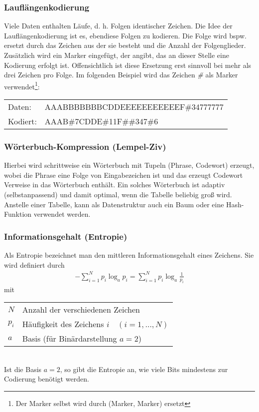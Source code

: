 \documentclass[11pt]{article}
\begin{document}
\subsubsection{Lauflängenkodierung}
Viele Daten enthalten Läufe, d. h. Folgen identischer Zeichen. Die Idee der Lauflängenkodierung ist es, ebendiese Folgen zu kodieren. Die Folge wird bspw. ersetzt durch das Zeichen aus der sie besteht und die Anzahl der Folgenglieder. Zusätzlich wird ein Marker eingefügt, der angibt, das an dieser Stelle eine Kodierung erfolgt ist. Offensichtlich ist diese Ersetzung erst sinnvoll bei mehr als drei Zeichen pro Folge. Im folgenden Beispiel wird das Zeichen \emph{\#} als Marker verwendet\footnote{Der Marker selbst wird durch (Marker, Marker) ersetzt}:
\begin{center}
  \begin{tabular}{ll}
    Daten: & AAABBBBBBBCDDEEEEEEEEEEEF\#34777777 \\
    Kodiert: & AAAB\#7CDDE\#11F\#\#347\#6
  \end{tabular}
\end{center}

\subsubsection{Wörterbuch-Kompression \textnormal{(Lempel-Ziv)}}
Hierbei wird schrittweise ein Wörterbuch mit Tupeln (Phrase, Codewort) erzeugt, wobei die Phrase eine Folge von Eingabezeichen ist und das erzeugt Codewort Verweise in das Wörterbuch enthält. Ein solches Wörterbuch ist adaptiv (selbstanpassend) und damit optimal, wenn die Tabelle beliebig groß wird. Anstelle einer Tabelle, kann als Datenstruktur auch ein Baum oder eine Hash-Funktion verwendet werden.

\subsubsection{Informationsgehalt \textnormal{(Entropie)}}
Als Entropie bezeichnet man den mittleren Informationsgehalt eines Zeichens. Sie wird definiert durch
\begin{align}
  -\sum\limits_{i=1}^N p_i \log_a p_i = \sum\limits_{i=1}^N p_i \log_a \frac{1}{p_i}
\end{align}
mit
\begin{tabular}{l l}
  \(N\) & Anzahl der verschiedenen Zeichen \\
  \(p_i\) & Häufigkeit des Zeichens \(i \quad (i=1, \dots, N)\) \\
  \(a\) & Basis (für Binärdarstellung \(a=2\))  
\end{tabular}\\
Ist die Basis \(a=2\), so gibt die Entropie an, wie viele Bits mindestens zur Codierung benötigt werden.
\end{document}
